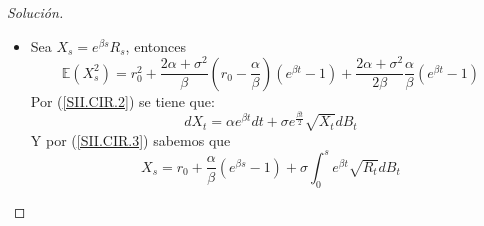 \documentclass[11pt,notitlepage]{article}
\newenvironment{solucion}
  {\begin{proof}[Solución]}
  {\end{proof}}
\begin{document}
\begin{solucion}
\begin{itemize}
\begin{equation}
                R_s =  r_0e^{-\beta s} +\frac{\alpha}{\beta}\left(1 - e^{-\beta s} \right) + \sigma\int_{0}^{s}e^{\beta t}\sqrt{R_t}dB_t
            \end{equation}
            La ecuación anterior representa a la cuasisolución mencionada con anterioridad, la cual será de utilidad para el calculo de la esperanza
            de \(R_s\), note que lo anterior no es una solución explícita de la ecuación en diferencias del modelo CIR, debido a que el lado 
            derecho de la igualdad anterior depende del proceso \(\{R_t\}_{t\geq 0}\). Pero como se calcula a partir de la ecuación anterior la esperanza, primeramente
            observe que, \(\int_{0}^{s}e^{\beta t}\sqrt{R_t}dB_t\) es una integral de Ito, y por lo tanto \(\mathbb{E}\left( \int_{0}^{s}e^{\beta t}\sqrt{R_t}dB_t\right) = 0\), así pues tomando esperanzas en (\ref{SII.CIR.4}) se obtiene:
            \begin{align*}
                \mathbb{E}( R_s) &= \mathbb{E}\left( r_0e^{-\beta s} +\frac{\alpha}{\beta}\left(1 - e^{-\beta s} \right) + \sigma\int_{0}^{s}e^{\beta t}\sqrt{R_t}dB_t\right)\\
                                 &= r_0e^{-\beta s} +\frac{\alpha}{\beta}\left(1 - e^{-\beta s} \right)  + \sigma\mathbb{E}\left( \int_{0}^{s}e^{\beta t}\sqrt{R_t}dB_t\right)\\
                                 &= r_0e^{-\beta s} +\frac{\alpha}{\beta}\left(1 - e^{-\beta s} \right) + 0
            \end{align*}
            Por tanto: 
            \[\mathbb{E}( R_s) = r_0e^{-\beta s} +\frac{\alpha}{\beta}\left(1 - e^{-\beta s} \right)\]
            Como dato curioso, observe que dicha esperanza es igual a la esperanza para la tasa de intéres en el modelo de Vasicek. 
            \item Sea \(X_s = e^{\beta s}R_s\), entonces 
            \[\mathbb{E}(X_{s}^2) = r_{0}^2 + \frac{2\alpha + \sigma^2}{\beta}\left(r_0 - \frac{\alpha}{\beta}\right)\left(e^{\beta t} -1\right) +
           \frac{2\alpha + \sigma^2}{2\beta}\frac{\alpha}{\beta}\left(e^{\beta t} -1\right)\]   
           Por (\ref{SII.CIR.2}) se tiene que: 
           \begin{equation}\label{SII.CIR.5}
               dX_t = \alpha e^{\beta t}dt + \sigma e^{\frac{\beta t}{2}}\sqrt{X_t}dB_t
           \end{equation}
           Y por (\ref{SII.CIR.3}) sabemos que 
           \begin{equation}\label{SII.CIR.6}
               X_s =  r_0 +\frac{\alpha}{\beta}\left(e^{\beta s} - 1 \right) + \sigma\int_{0}^{s}e^{\beta t}\sqrt{R_t}dB_t

\end{equation}
\end{itemize}
\end{solucion}
\end{document}
